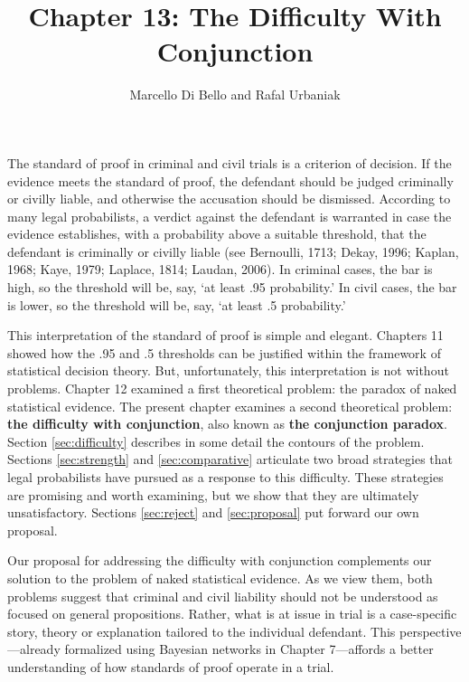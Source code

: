 \documentclass[
  10pt,
  dvipsnames,enabledeprecatedfontcommands]{scrartcl}
\title{Chapter 13: The Difficulty With Conjunction}
\author{Marcello Di Bello and Rafal Urbaniak}
\date{}
\begin{document}
\maketitle

The standard of proof in criminal and civil trials is a criterion of
decision. If the evidence meets the standard of proof, the defendant
should be judged criminally or civilly liable, and otherwise the
accusation should be dismissed. According to many legal probabilists, a
verdict against the defendant is warranted in case the evidence
establishes, with a probability above a suitable threshold, that the
defendant is criminally or civilly liable (see Bernoulli, 1713; Dekay,
1996; Kaplan, 1968; Kaye, 1979; Laplace, 1814; Laudan, 2006). In
criminal cases, the bar is high, so the threshold will be, say, `at
least .95 probability.' In civil cases, the bar is lower, so the
threshold will be, say, `at least .5 probability.'

This interpretation of the standard of proof is simple and elegant.
Chapters 11  showed how the .95 and .5
thresholds can be justified within the framework of statistical decision
theory. But, unfortunately, this interpretation is not without problems.
Chapter 12  examined a first theoretical
problem: the paradox of naked statistical evidence. The present chapter
examines a second theoretical problem:
\textbf{the difficulty with conjunction}, also known as
\textbf{the conjunction paradox}. Section \ref{sec:difficulty} describes
in some detail the contours of the problem. Sections \ref{sec:strength}
and \ref{sec:comparative} articulate two broad strategies that legal
probabilists have pursued as a response to this difficulty. These
strategies are promising and worth examining, but we show that they are
ultimately unsatisfactory. Sections \ref{sec:reject} and
\ref{sec:proposal} put forward our own proposal.

Our proposal for addressing the difficulty with conjunction complements
our solution to the problem of naked statistical evidence. As we view
them, both problems suggest that criminal and civil liability should not
be understood as focused on general propositions. Rather, what is at
issue in trial is a case-specific story, theory or explanation tailored
to the individual defendant. This perspective---already formalized using
Bayesian networks in Chapter 7---affords
a better understanding of how standards of proof operate in a trial.
\end{document}
